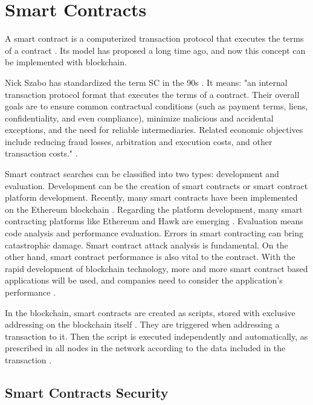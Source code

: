 \section{Smart Contracts}\label{sec:smartContracts}

A smart contract is a computerized transaction protocol that executes the terms of a contract \cite{szabo1997idea}. Its model has proposed a long time ago, and now this concept can be implemented with blockchain.

Nick Szabo has standardized the term \acf{SC} in the 90s \cite{greve2018blockchain}. It means: "an internal transaction protocol format that executes the terms of a contract. Their overall goals are to ensure common contractual conditions (such as payment terms, liens, confidentiality, and even compliance), minimize malicious and accidental exceptions, and the need for reliable intermediaries. Related economic objectives include reducing fraud losses, arbitration and execution costs, and other transaction costs." \cite{szabo1997idea}.

Smart contract searches can be classified into two types: development and evaluation. Development can be the creation of smart contracts or smart contract platform development. Recently, many smart contracts have been implemented on the Ethereum blockchain \cite{wood2018secure}. Regarding the platform development, many smart contracting platforms like Ethereum \cite{wood2018secure} and Hawk \cite{kosbaa2016theblockchain} are emerging \cite{zheng2016blockchain}. Evaluation means code analysis and performance evaluation. Errors in smart contracting can bring catastrophic damage. Smart contract attack analysis is fundamental. On the other hand, smart contract performance is also vital to the contract. With the rapid development of blockchain technology, more and more smart contract based applications will be used, and companies need to consider the application's performance \cite{zheng2016blockchain}.

In the blockchain, smart contracts are created as scripts, stored with exclusive addressing on the blockchain itself \cite{greve2018blockchain}. They are triggered when addressing a transaction to it. Then the script is executed independently and automatically, as prescribed in all nodes in the network according to the data included in the transaction \cite{christidis2016blockchains}.

\subsection{Smart Contracts Security}\label{sec:seguranca}

